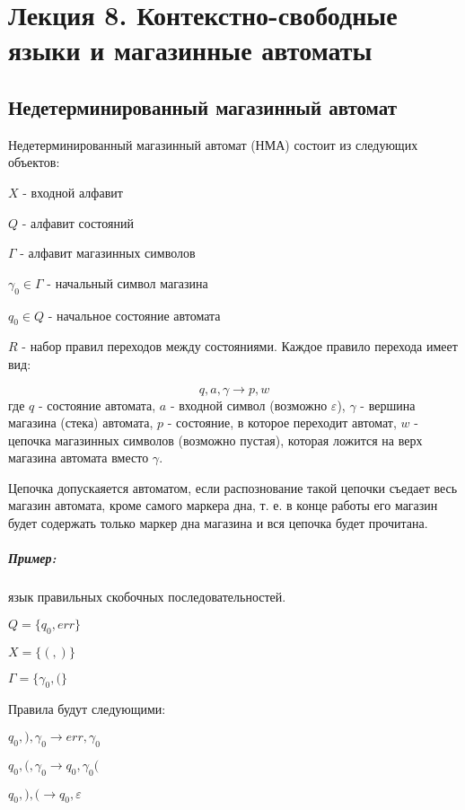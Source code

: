 \chapter{Лекция 8. Контекстно-свободные языки и магазинные автоматы}

\section{Недетерминированный магазинный автомат}

\begin{Def}
Недетерминированный магазинный автомат (НМА) состоит из следующих объектов:

$X$ - входной алфавит

$Q$ - алфавит состояний

$\Gamma$ - алфавит магазинных символов

$\gamma_0 \in \Gamma$ - начальный символ магазина

$q_0 \in Q$ - начальное состояние автомата

$R$ - набор правил переходов между состояниями. Каждое правило перехода имеет вид:

$$q, a, \gamma \rightarrow p,w$$
где $q$ - состояние автомата, $a$ - входной символ (возможно $\varepsilon$), $\gamma$ - вершина магазина (стека) автомата, $p$ - состояние, в которое переходит автомат, $w$ - цепочка
магазинных символов (возможно пустая), которая ложится на верх магазина автомата вместо $\gamma$.

Цепочка допускаяется автоматом, если распознование такой цепочки съедает весь магазин автомата, кроме
самого маркера дна, т. е. в конце работы его магазин будет содержать только маркер дна магазина
и вся цепочка будет прочитана.
\end{Def}

\paragraph{Пример:} язык правильных скобочных последовательностей.

$Q = \lbrace q_0, err \rbrace$

$X = \lbrace (, )\rbrace$

$\Gamma = \lbrace \gamma_0, ( \rbrace$

Правила будут следующими:

$q_0, ), \gamma_0 \rightarrow err, \gamma_0$

$q_0, (, \gamma_0 \rightarrow q_0, \gamma_0 ($

$q_0, ), ( \rightarrow q_0, \varepsilon$

